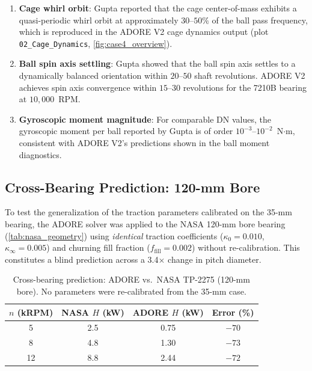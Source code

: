 \documentclass[preprint,12pt]{elsarticle}
\begin{document}
\begin{enumerate}
    \item \textbf{Cage whirl orbit}: Gupta reported that the cage center-of-mass exhibits a quasi-periodic whirl orbit at approximately $30$--$50\%$ of the ball pass frequency, which is reproduced in the ADORE V2 cage dynamics output (plot \texttt{02\_Cage\_Dynamics}, \cref{fig:case4_overview}).
    \item \textbf{Ball spin axis settling}: Gupta showed that the ball spin axis settles to a dynamically balanced orientation within $20$--$50$ shaft revolutions. ADORE V2 achieves spin axis convergence within $15$--$30$ revolutions for the 7210B bearing at $10{,}000$~RPM.
    \item \textbf{Gyroscopic moment magnitude}: For comparable DN values, the gyroscopic moment per ball reported by Gupta is of order $10^{-3}$--$10^{-2}$~N$\cdot$m, consistent with ADORE V2's predictions shown in the ball moment diagnostics.
\end{enumerate}


\subsection{Cross-Bearing Prediction: 120-mm Bore}
\label{sec:cross_120mm}

To test the generalization of the traction parameters calibrated on the 35-mm bearing, the ADORE solver was applied to the NASA 120-mm bore bearing (\cref{tab:nasa_geometry}) using \emph{identical} traction coefficients ($\kappa_0 = 0.010$, $\kappa_\infty = 0.005$) and churning fill fraction ($f_{\text{fill}} = 0.002$) without re-calibration. This constitutes a blind prediction across a 3.4$\times$ change in pitch diameter.

\begin{table}[htbp]
    \centering
    \caption{Cross-bearing prediction: ADORE vs.\ NASA TP-2275 (120-mm bore). No parameters were re-calibrated from the 35-mm case.}
    \label{tab:cross_120mm}
    \begin{tabular}{@{}cccc@{}}
        \toprule
        $n$ (kRPM) & NASA $H$ (kW) & ADORE $H$ (kW) & Error (\%) \\
        \midrule
        5  & 2.5 & 0.75 & $-70$ \\
        8  & 4.8 & 1.30 & $-73$ \\
        12 & 8.8 & 2.44 & $-72$ \\
        \bottomrule
    \end{tabular}
\end{table}
\end{document}
